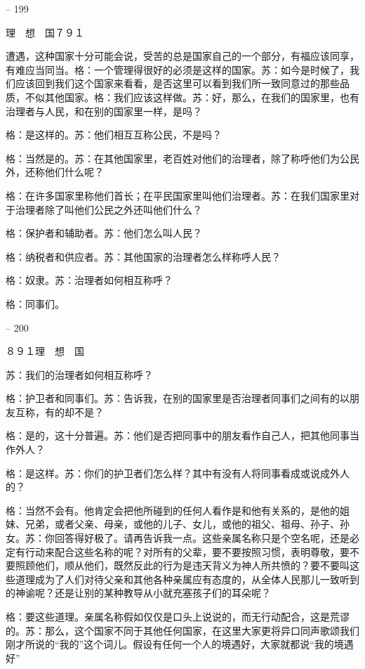 \documentclass[11pt,oneside]{book}
\begin{document}
\begin{common-format}
    

-- 199

    理　想　国７９１

    遭遇，这种国家十分可能会说，受苦的总是国家自己的一个部分，有福应该同享，有难应当同当。格：一个管理得很好的必须是这样的国家。苏：如今是时候了，我们应该回到我们这个国家来看看，是否这里可以看到我们所一致同意过的那些品质，不似其他国家。格：我们应该这样做。苏：好，那么，在我们的国家里，也有治理者与人民，和在别的国家里一样，是吗？

    格：是这样的。苏：他们相互互称公民，不是吗？

    格：当然是的。苏：在其他国家里，老百姓对他们的治理者，除了称呼他们为公民外，还称他们什么呢？

    格：在许多国家里称他们首长；在平民国家里叫他们治理者。苏：在我们国家里对于治理者除了叫他们公民之外还叫他们什么？

    格：保护者和辅助者。苏：他们怎么叫人民？

    格：纳税者和供应者。苏：其他国家的治理者怎么样称呼人民？

    格：奴隶。苏：治理者如何相互称呼？

    格：同事们。

    

-- 200

    ８９１理　想　国

    苏：我们的治理者如何相互称呼？

    格：护卫者和同事们。苏：告诉我，在别的国家里是否治理者同事们之间有的以朋友互称，有的却不是？

    格：是的，这十分普遍。苏：他们是否把同事中的朋友看作自己人，把其他同事当作外人？

    格：是这样。苏：你们的护卫者们怎么样？其中有没有人将同事看成或说成外人的？

    格：当然不会有。他肯定会把他所碰到的任何人看作是和他有关系的，是他的姐妹、兄弟，或者父亲、母亲，或他的儿子、女儿，或他的祖父、祖母、孙子、孙女。苏：你回答得好极了。请再告诉我一点。这些亲属名称只是个空名呢，还是必定有行动来配合这些名称的呢？对所有的父辈，要不要按照习惯，表明尊敬，要不要照顾他们，顺从他们，既然反此的行为是违天背义为神人所共愤的？要不要叫这些道理成为了人们对待父亲和其他各种亲属应有态度的，从全体人民那儿一致听到的神谕呢？还是让别的某种教导从小就充塞孩子们的耳朵呢？

    格：要这些道理。亲属名称假如仅仅是口头上说说的，而无行动配合，这是荒谬的。苏：那么，这个国家不同于其他任何国家，在这里大家更将异口同声歌颂我们刚才所说的“我的”这个词儿。假设有任何一个人的境遇好，大家就都说“我的境遇好”


\end{common-format}
\end{document}
